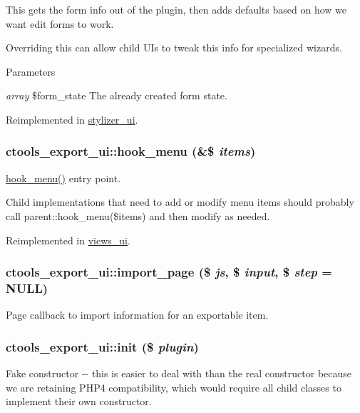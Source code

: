 This gets the form info out of the plugin, then adds defaults based on how we want edit forms to work.

Overriding this can allow child UIs to tweak this info for specialized wizards.


\begin{DoxyParams}{Parameters}
\item[{\em array}]\$form\_\-state The already created form state. \end{DoxyParams}


Reimplemented in \hyperlink{classstylizer__ui_a32963e1d98f25fb218bdfa3270286623}{stylizer\_\-ui}.\hypertarget{classctools__export__ui_a5ee980ee59378fdeb612e429e18f08c7}{
\subsubsection[{hook\_\-menu}]{\setlength{\rightskip}{0pt plus 5cm}ctools\_\-export\_\-ui::hook\_\-menu (\&\$ {\em items})}}
\label{classctools__export__ui_a5ee980ee59378fdeb612e429e18f08c7}
\hyperlink{classctools__export__ui_a5ee980ee59378fdeb612e429e18f08c7}{hook\_\-menu()} entry point.

Child implementations that need to add or modify menu items should probably call parent::hook\_\-menu(\$items) and then modify as needed. 

Reimplemented in \hyperlink{classviews__ui_a2a5885b9b860fd53a304e1ac38237a56}{views\_\-ui}.\hypertarget{classctools__export__ui_a9b7e82eb64b9f7d5fa57ae2a7e9bcda2}{
\subsubsection[{import\_\-page}]{\setlength{\rightskip}{0pt plus 5cm}ctools\_\-export\_\-ui::import\_\-page (\$ {\em js}, \/  \$ {\em input}, \/  \$ {\em step} = {\ttfamily NULL})}}
\label{classctools__export__ui_a9b7e82eb64b9f7d5fa57ae2a7e9bcda2}
Page callback to import information for an exportable item. \hypertarget{classctools__export__ui_a6e2c9b8dca7d4f8ec8d7badaa1b51f48}{
\subsubsection[{init}]{\setlength{\rightskip}{0pt plus 5cm}ctools\_\-export\_\-ui::init (\$ {\em plugin})}}
\label{classctools__export__ui_a6e2c9b8dca7d4f8ec8d7badaa1b51f48}
Fake constructor -\/-\/ this is easier to deal with than the real constructor because we are retaining PHP4 compatibility, which would require all child classes to implement their own constructor. 

